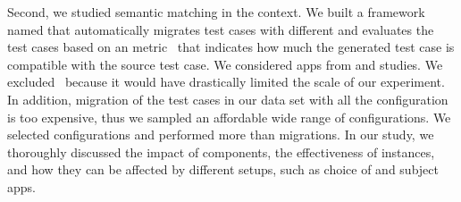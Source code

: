 


\smallskip 
Second, we studied semantic matching in the \testreuse context.
We built a framework named \tme that automatically migrates test cases with different \smconfigs and evaluates the test cases based on an \fscore metric~\cite{zhao:fruiter:fse:2020} that indicates how much the generated test case is compatible with the source test case.
We considered  \nexecapps apps from \atm and \craftdroid studies.
We excluded \adaptdroid~\selector because it would have drastically limited the scale of our experiment.
In addition, migration of the test cases in our data set with all the \ncomb configuration is too expensive, thus we sampled an affordable wide range of configurations.  
We selected \nsampledcomb configurations and performed more than \nmigrations migrations.
In our study, we  thoroughly discussed the impact of components, the effectiveness of instances, and how they can be affected by different setups, such as choice of \selector and subject apps.

